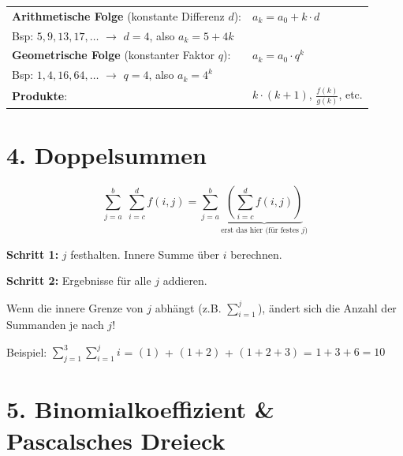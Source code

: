 \documentclass[10pt, a4paper]{article}
\begin{document}
\begin{tipbox}
\begin{tabular}{ll}
    \textbf{Arithmetische Folge} (konstante Differenz $d$): & $a_k = a_0 + k \cdot d$ \\
    Bsp: $5, 9, 13, 17, \ldots$ $\rightarrow$ $d = 4$, also $a_k = 5 + 4k$ \\[4pt]
    \textbf{Geometrische Folge} (konstanter Faktor $q$): & $a_k = a_0 \cdot q^k$ \\
    Bsp: $1, 4, 16, 64, \ldots$ $\rightarrow$ $q = 4$, also $a_k = 4^k$ \\[4pt]
    \textbf{Produkte}: & $k \cdot (k+1)$, $\frac{f(k)}{g(k)}$, etc.
\end{tabular}
\end{tipbox}

\section*{4. Doppelsummen}

\begin{defbox}
\[
    \sum_{j=a}^{b}\; \sum_{i=c}^{d} f(i, j) = \sum_{j=a}^{b} \underbrace{\left(\sum_{i=c}^{d} f(i, j)\right)}_{\text{erst das hier (f\"ur festes } j\text{)}}
\]

\textbf{Schritt 1:} $j$ festhalten. Innere Summe \"uber $i$ berechnen.

\textbf{Schritt 2:} Ergebnisse f\"ur alle $j$ addieren.
\end{defbox}

\begin{warnbox}
Wenn die innere Grenze von $j$ abh\"angt (z.B. $\sum_{i=1}^{j}$), \"andert sich die Anzahl der Summanden je nach $j$!

Beispiel: $\displaystyle\sum_{j=1}^{3} \sum_{i=1}^{j} i$ = $(1)$ + $(1+2)$ + $(1+2+3)$ = $1 + 3 + 6 = 10$
\end{warnbox}

\section*{5. Binomialkoeffizient \& Pascalsches Dreieck}
\end{document}
